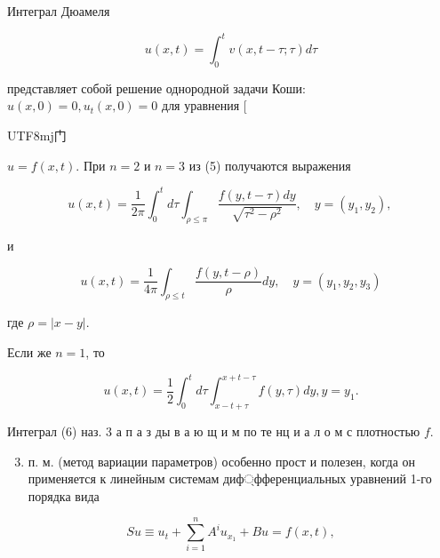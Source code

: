\documentclass[10pt]{article}
\begin{document}
Интеграл Дюамеля



\[

u(x, t)=\int_{0}^{t} v(x, t-\tau ; \tau) d \tau

\]



представляет собой решение однородной задачи Коши: $u(x, 0)=0, u_{t}(x, 0)=0$ для уравнения [\begin{CJK}{UTF8}{mj}门\end{CJK} $u=f(x, t)$. При $n=2$ и $n=3$ из (5) получаются выражения



\[

u(x, t)=\frac{1}{2 \pi} \int_{0}^{t} d \tau \int_{\rho \leqslant \pi} \frac{f(y, t-\tau) d y}{\sqrt{\tau^{2}-\rho^{2}}}, \quad y=\left(y_{1}, y_{2}\right) \text {, }

\]



и



\[

u(x, t)=\frac{1}{4 \pi} \int_{\rho \leqslant t} \frac{f(y, t-\rho)}{\rho} d y, \quad y=\left(y_{1}, y_{2}, y_{3}\right)

\]



где $\rho=|x-y|$.



Если же $n=1$, то



\[

u(x, t)=\frac{1}{2} \int_{0}^{t} d \tau \int_{x-t+\tau}^{x+t-\tau} f(y, \tau) d y, y=y_{1} .

\]



Интеграл (6) наз. 3 а п а з ды в а ю щ и м по те нц и а л о м с плотностью $f$.



\begin{enumerate}

  \setcounter{enumi}{2}

  \item п. м. (метод вариации параметров) особенно прост и полезен, когда он применяется к линейным системам диф্фференциальных уравнений 1-го порядка вида

\end{enumerate}



\[

S u \equiv u_{t}+\sum_{i=1}^{n} A^{i} u_{x_{1}}+B u=f(x, t),

\]
\end{document}
